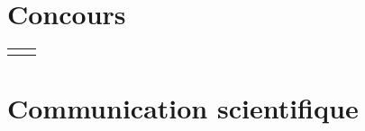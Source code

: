 \documentclass[
	10pt, %
]{FreemanCV}
\begin{document}
\begin{paracol}{2}

\section{Concours}




\begin{supertabular}{r l} %
	
	
	\tableentry{}{\textit{\uca}}{}
	\tableentry{}{}{}
	
	
\end{supertabular}




\section{Communication scientifique}




\end{paracol}
\end{document}
